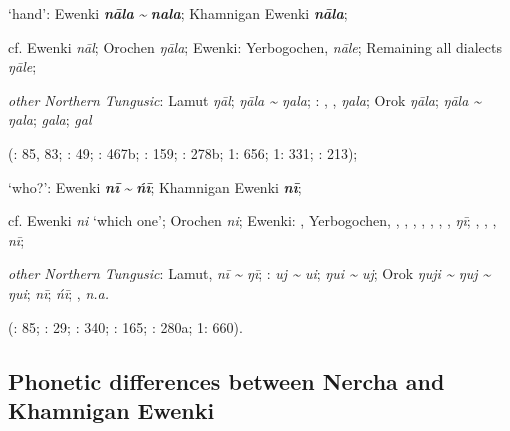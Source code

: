\documentclass[output=paper,colorlinks,citecolor=brown]{langscibook}
\begin{document}
\ea ‘hand’:  Ewenki \textbf{\textit{nāla}} \textit{{\textasciitilde}} \textbf{\textit{nala}}; Khamnigan Ewenki \textbf{\textit{nāla}};

    cf.  Ewenki \textit{nāl}; Orochen \textit{ŋāla};  Ewenki: Yerbogochen,  \textit{nāle}; Remaining all dialects \textit{ŋāle};

    \textit{other Northern Tungusic}: Lamut \textit{ŋāl};  \textit{ŋāla {\textasciitilde} ŋala}; \textit{}: , ,  \textit{ŋala}; Orok \textit{ŋāla};  \textit{ŋāla {\textasciitilde} ŋala};  \textit{gala};  \textit{gal}
    
    (\citealt{Castrén1856}: 85, 83; \citealt{Janhunen1991}: 49; \citealt{Dorji1998}: 467b; \citealt{Chaoke2014a}: 159; \citealt{Vasilevic1958}: 278b; \citealt{Cincius1975B} 1: 656; \citealt{Hauer1952} 1: 331; \citealt{Zikmundová2013a}: 213);

    \ex ‘who?’:  Ewenki \textbf{\textit{nī}} \textit{{\textasciitilde}} \textbf{\textit{ńī}}; Khamnigan Ewenki \textbf{\textit{nī}};

    cf.  Ewenki \textit{ni} ‘which one’; Orochen \textit{ni};  Ewenki: , Yerbogochen, , , , , , , ,  \textit{ŋī}; , , ,  \textit{nī};

    \textit{other Northern Tungusic}: Lamut,  \textit{nī {\textasciitilde} ŋī}; \textit{}:  \textit{uj {\textasciitilde} ui};  \textit{ŋui {\textasciitilde} uj}; Orok \textit{ŋuji {\textasciitilde} ŋuj {\textasciitilde} ŋui};  \textit{nī};  \textit{ńī}; ,  \textit{n.a.} 
    
    (\citealt{Castrén1856}: 85; \citealt{Janhunen1991}: 29; \citealt{Chaoke2014bB}: 340; \citealt{Chaoke2014a}: 165; \citealt{Vasilevic1958}: 280a; \citealt{Cincius1975B} 1: 660).

\z
\z
\subsection{Phonetic differences between Nercha and {Khamnigan} {Ewenki}}
\end{document}
